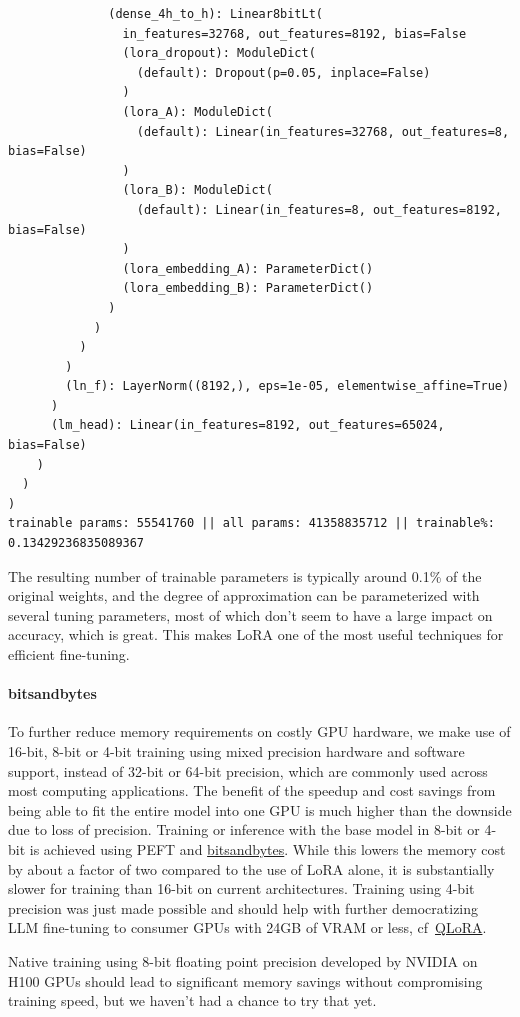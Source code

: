 \documentclass{article}
\begin{document}
\begin{small}
\begin{verbatim}
              (dense_4h_to_h): Linear8bitLt(
                in_features=32768, out_features=8192, bias=False
                (lora_dropout): ModuleDict(
                  (default): Dropout(p=0.05, inplace=False)
                )
                (lora_A): ModuleDict(
                  (default): Linear(in_features=32768, out_features=8, bias=False)
                )
                (lora_B): ModuleDict(
                  (default): Linear(in_features=8, out_features=8192, bias=False)
                )
                (lora_embedding_A): ParameterDict()
                (lora_embedding_B): ParameterDict()
              )
            )
          )
        )
        (ln_f): LayerNorm((8192,), eps=1e-05, elementwise_affine=True)
      )
      (lm_head): Linear(in_features=8192, out_features=65024, bias=False)
    )
  )
)
trainable params: 55541760 || all params: 41358835712 || trainable%: 0.13429236835089367
\end{verbatim}
\end{small}
The resulting number of trainable parameters is typically around 0.1\% of the original weights, and the degree of approximation can be parameterized with several tuning parameters, most of which don't seem to have a large impact on accuracy, which is great. This makes LoRA one of the most useful techniques for efficient fine-tuning.

\paragraph{bitsandbytes}
To further reduce memory requirements on costly GPU hardware, we make use of 16-bit, 8-bit or 4-bit training using mixed precision hardware and software support, instead of 32-bit or 64-bit precision, which are commonly used across most computing applications. The benefit of the speedup and cost savings from being able to fit the entire model into one GPU is much higher than the downside due to loss of precision. Training or inference with the base model in 8-bit or 4-bit is achieved using PEFT and \href{https://github.com/TimDettmers/bitsandbytes}{bitsandbytes}. While this lowers the memory cost by about a factor of two compared to the use of LoRA alone, it is substantially slower for training than 16-bit on current architectures. Training using 4-bit precision was just made possible and should help with further democratizing LLM fine-tuning to consumer GPUs with 24GB of VRAM or less, cf~\href{https://arxiv.org/abs/2305.14314}{QLoRA}.

Native training using 8-bit floating point precision developed by NVIDIA on H100 GPUs should lead to significant memory savings without compromising training speed, but we haven't had a chance to try that yet.
\end{document}
